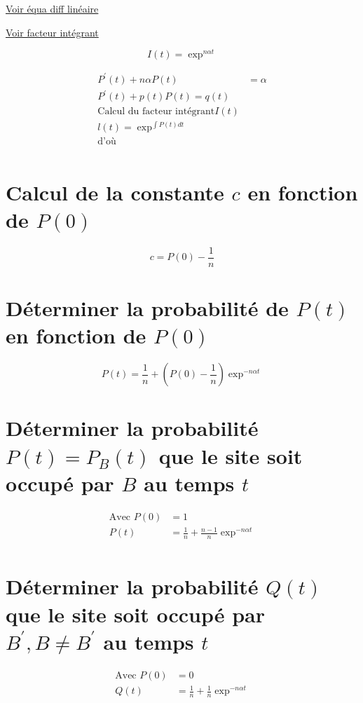 \documentclass[11pt,a4paper]{article}
\begin{document}
	
	
	\href{https://fr.wikipedia.org/wiki/%C3%A9quation_diff%C3%A9rentielle_linéaire}{Voir équa diff linéaire}
		
	\href{https://fr.wikipedia.org/wiki/Facteur_int%C3%A9grant}{Voir facteur intégrant}
	
	$$I(t) = \exp^{n\alpha t}$$
	
	\begin{align*}
		P^{\prime}(t) + n\alpha P(t) &= \alpha\\
		P^{\prime}(t) + p(t)P(t) = q(t)\\
		\text{Calcul du facteur intégrant} I(t) &\\
		l(t) = \exp^{\int{P(t)dt}}&\\
		\text{d'où}&\\
	\end{align*}
	
	\section{Calcul de la constante $c$ en fonction de $P(0)$}
	
	$$c = P(0) - \frac{1}{n}$$
	
	\section{Déterminer la probabilité de $P(t)$ en fonction de $P(0)$}
	
	$$P(t) = \frac{1}{n} + \left( P(0) - \frac{1}{n} \right) \exp^{-n\alpha t}$$
	
	\section{Déterminer la probabilité $P(t) = P_{B}(t)$ que le site soit occupé par $B$ au temps $t$}
	
	\begin{align*}
		\text{Avec } P(0) &= 1\\
		P(t) &= \frac{1}{n} + \frac{n - 1}{n}\exp^{-n\alpha t}\\
	\end{align*}
	
	\section{Déterminer la probabilité $Q(t)$ que le site soit occupé par $B^{\prime}, B \neq B^{\prime}$ au temps $t$}
	
	\begin{align*}
		\text{Avec } P(0) &= 0\\
		Q(t) &= \frac{1}{n} + \frac{1}{n}\exp^{-n\alpha t}
	\end{align*}
	
\end{document}
